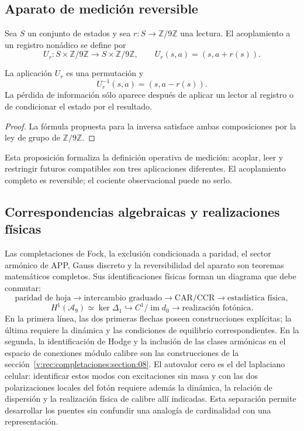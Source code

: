 \subsection{Aparato de medición reversible}
\label{v:rec:completaciones:section:10}

Sea \(S\) un conjunto de estados y sea \(r:S\to\mathbb Z/9\mathbb Z\) una
lectura. El acoplamiento a un registro nonádico se define por
\[
 U_r:S\times\mathbb Z/9\mathbb Z\longrightarrow
 S\times\mathbb Z/9\mathbb Z,
 \qquad
 U_r(s,a)=(s,a+r(s)).
\]

\begin{proposition}
\label{v:rec:completaciones:statement:05}
La aplicación \(U_r\) es una permutación y
\[
 U_r^{-1}(s,a)=(s,a-r(s)).
\]
La pérdida de información sólo aparece después de aplicar un lector al
registro o de condicionar el estado por el resultado.
\end{proposition}

\begin{proof}
La fórmula propuesta para la inversa satisface ambas composiciones por la
ley de grupo de \(\mathbb Z/9\mathbb Z\).
\end{proof}

Esta proposición formaliza la definición operativa de medición: acoplar,
leer y restringir futuros compatibles son tres aplicaciones diferentes. El
acoplamiento completo es reversible; el cociente observacional puede no serlo.

\subsection{Correspondencias algebraicas y realizaciones físicas}
\label{v:rec:completaciones:section:11}

Las completaciones de Fock, la exclusión condicionada a paridad, el sector
armónico de APP, Gauss discreto y la reversibilidad del aparato son teoremas
matemáticos completos. Sus identificaciones físicas forman un diagrama que
debe conmutar:
\[
 \text{paridad de hoja}
 \longrightarrow\text{intercambio graduado}
 \longrightarrow\text{CAR/CCR}
 \longrightarrow\text{estadística física},
\]
\[
 H^1(\mathcal A_9)\simeq\ker\Delta_1
 \hookrightarrow C^1/\operatorname{im}d_0
 \longrightarrow\text{realización fotónica}.
\]
En la primera línea, las dos primeras flechas poseen construcciones
explícitas; la última requiere la dinámica y las condiciones de equilibrio
correspondientes. En la segunda, la identificación de Hodge y la inclusión
de las clases armónicas en el espacio de conexiones módulo calibre son las
construcciones de la sección~\ref{v:rec:completaciones:section:08}. El autovalor
cero es el del laplaciano celular: identificar estos modos con excitaciones
sin masa y con las dos polarizaciones locales del fotón requiere además la
dinámica, la relación de dispersión y la realización física de calibre allí
indicadas. Esta separación permite desarrollar los puentes sin confundir una
analogía de cardinalidad con una representación.
